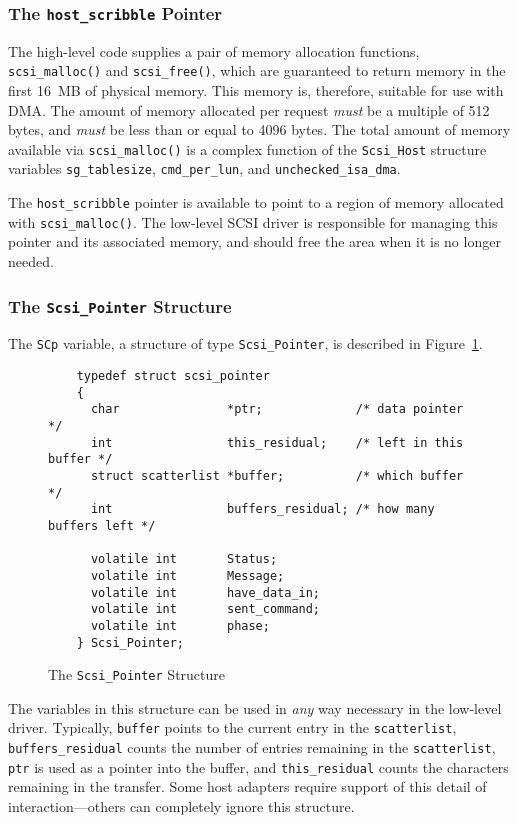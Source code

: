 \subsubsection{The {\tt host\_scribble} Pointer}

The high-level code supplies a pair of memory allocation functions,
\verb|scsi_malloc()| and \verb|scsi_free()|, which are guaranteed to return
memory in the first 16~MB of physical memory.  This memory is, therefore,
suitable for use with DMA\@.  The amount of memory allocated per request {\em
  must\/} be a multiple of 512 bytes, and {\em must\/} be less than or
equal to 4096 bytes.  The total amount of memory available via
\verb|scsi_malloc()| is a complex function of the \verb|Scsi_Host|
structure variables \verb|sg_tablesize|, \verb|cmd_per_lun|, and
\verb|unchecked_isa_dma|.

The \verb|host_scribble| pointer is available to point to a region of
memory allocated with \verb|scsi_malloc()|.  The low-level SCSI driver is
responsible for managing this pointer and its associated memory, and should
free the area when it is no longer needed.

\subsubsection{The {\tt Scsi\_Pointer} Structure}

The \verb|SCp| variable, a structure of type \verb|Scsi_Pointer|, is
described in Figure~\ref{fig:scsi.pointer}.
\begin{figure}[hbtp]
  \leavevmode
  \begin{center}
    \begin{verbatim}
    typedef struct scsi_pointer
    {
      char               *ptr;             /* data pointer */
      int                this_residual;    /* left in this buffer */
      struct scatterlist *buffer;          /* which buffer */
      int                buffers_residual; /* how many buffers left */

      volatile int       Status;
      volatile int       Message;
      volatile int       have_data_in;
      volatile int       sent_command;
      volatile int       phase;
    } Scsi_Pointer;
    \end{verbatim}
    \caption{The {\tt Scsi\_Pointer} Structure}
    \label{fig:scsi.pointer}
  \end{center}
\end{figure}
The variables in this structure can be used in {\em any\/} way necessary in
the low-level driver.  Typically, \verb|buffer| points to the current entry
in the \verb|scatterlist|, \verb|buffers_residual| counts the number of
entries remaining in the \verb|scatterlist|, \verb|ptr| is used as a
pointer into the buffer, and \verb|this_residual| counts the characters
remaining in the transfer.  Some host adapters require support of this
detail of interaction---others can completely ignore this structure.

